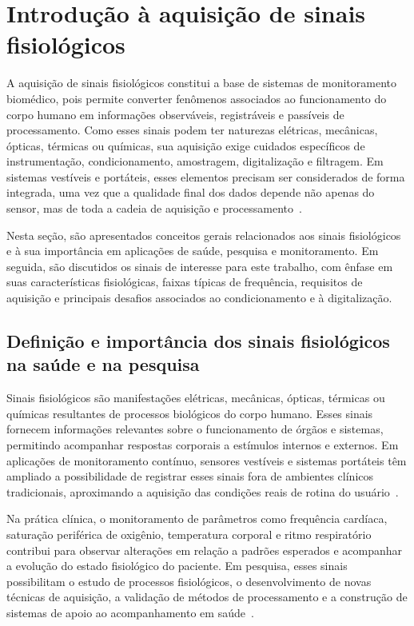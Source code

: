 \documentclass[a4paper,12pt]{fcte}
\begin{document}
\section{Introdução à aquisição de sinais fisiológicos}

A aquisição de sinais fisiológicos constitui a base de sistemas de monitoramento biomédico, pois permite converter fenômenos associados ao funcionamento do corpo humano em informações observáveis, registráveis e passíveis de processamento. Como esses sinais podem ter naturezas elétricas, mecânicas, ópticas, térmicas ou químicas, sua aquisição exige cuidados específicos de instrumentação, condicionamento, amostragem, digitalização e filtragem. Em sistemas vestíveis e portáteis, esses elementos precisam ser considerados de forma integrada, uma vez que a qualidade final dos dados depende não apenas do sensor, mas de toda a cadeia de aquisição e processamento~\cite{ates2022wearable_sensors,vaghasiya2023wearable_telehealth}.

Nesta seção, são apresentados conceitos gerais relacionados aos sinais fisiológicos e à sua importância em aplicações de saúde, pesquisa e monitoramento. Em seguida, são discutidos os sinais de interesse para este trabalho, com ênfase em suas características fisiológicas, faixas típicas de frequência, requisitos de aquisição e principais desafios associados ao condicionamento e à digitalização.

\subsection{Definição e importância dos sinais fisiológicos na saúde e na pesquisa}

Sinais fisiológicos são manifestações elétricas, mecânicas, ópticas, térmicas ou químicas resultantes de processos biológicos do corpo humano. Esses sinais fornecem informações relevantes sobre o funcionamento de órgãos e sistemas, permitindo acompanhar respostas corporais a estímulos internos e externos. Em aplicações de monitoramento contínuo, sensores vestíveis e sistemas portáteis têm ampliado a possibilidade de registrar esses sinais fora de ambientes clínicos tradicionais, aproximando a aquisição das condições reais de rotina do usuário~\cite{ates2022wearable_sensors,vaghasiya2023wearable_telehealth}.

Na prática clínica, o monitoramento de parâmetros como frequência cardíaca, saturação periférica de oxigênio, temperatura corporal e ritmo respiratório contribui para observar alterações em relação a padrões esperados e acompanhar a evolução do estado fisiológico do paciente. Em pesquisa, esses sinais possibilitam o estudo de processos fisiológicos, o desenvolvimento de novas técnicas de aquisição, a validação de métodos de processamento e a construção de sistemas de apoio ao acompanhamento em saúde~\cite{huhn2022wearables_health_research,tan2024remote_patient_monitoring}.
\end{document}
